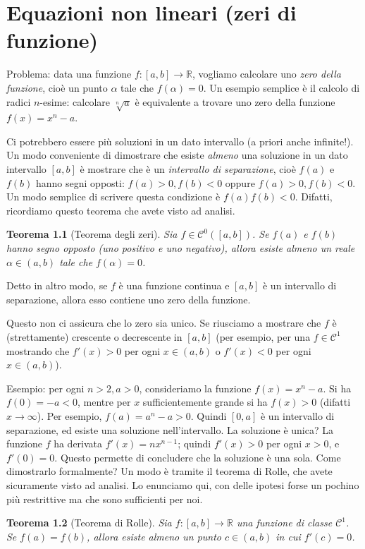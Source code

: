 \documentclass[a4paper]{report}
\newtheorem{theorem}{Teorema}[chapter]
\theoremstyle{definiton}
\theoremstyle{remark}
\begin{document}
\chapter{Equazioni non lineari (zeri di funzione)}

Problema: data una funzione $f: [a,b] \to \mathbb{R}$, vogliamo calcolare uno \emph{zero della funzione}, cioè un punto $\alpha$ tale che $f(\alpha) = 0$. Un esempio semplice è il calcolo di radici $n$-esime: calcolare $\sqrt[n]{a}$ è equivalente a trovare uno zero della funzione $f(x) = x^n - a$.

Ci potrebbero essere più soluzioni in un dato intervallo (a priori anche infinite!). Un modo conveniente di dimostrare che esiste \emph{almeno} una soluzione in un dato intervallo $[a,b]$ è mostrare che è un \emph{intervallo di separazione}, cioè $f(a)$ e $f(b)$ hanno segni opposti: $f(a)>0,f(b)<0$ oppure $f(a)>0,f(b)<0$. Un modo semplice di scrivere questa condizione è $f(a)f(b) < 0$. Difatti, ricordiamo questo teorema che avete visto ad analisi.
\begin{theorem}[Teorema degli zeri]
Sia $f \in \mathcal{C}^0([a,b])$. Se $f(a)$ e $f(b)$ hanno segno opposto (uno positivo e uno negativo), allora esiste almeno un reale $\alpha \in (a,b)$ tale che $f(\alpha) = 0$.
\end{theorem}
Detto in altro modo, se $f$ è una funzione continua e $[a,b]$ è un intervallo di separazione, allora esso contiene uno zero della funzione.

Questo non ci assicura che lo zero sia unico. Se riusciamo a mostrare che $f$ è (strettamente) crescente o decrescente in $[a,b]$ (per esempio, per una $f\in\mathcal{C}^1$ mostrando che $f'(x) > 0$ per ogni $x\in (a,b)$ o $f'(x) < 0$ per ogni $x\in (a,b)$).

Esempio: per ogni $n>2, a > 0$, consideriamo la funzione $f(x) = x^n - a$. Si ha $f(0) = -a < 0$, mentre per $x$ sufficientemente grande si ha $f(x) > 0$ (difatti $x \to \infty$). Per esempio, $f(a) = a^n - a > 0$. Quindi $[0,a]$ è un intervallo di separazione, ed esiste una soluzione nell'intervallo. La soluzione è unica? La funzione $f$ ha derivata $f'(x) = nx^{n-1}$; quindi $f'(x) > 0$ per ogni $x > 0$, e $f'(0) = 0$. Questo permette di concludere che la soluzione è una sola. Come dimostrarlo formalmente? Un modo è tramite il teorema di Rolle, che avete sicuramente visto ad analisi. Lo enunciamo qui, con delle ipotesi forse un pochino più restrittive ma che sono sufficienti per noi.

\begin{theorem}[Teorema di Rolle]
Sia $f:[a,b] \to \mathbb{R}$ una funzione di classe $\mathcal{C}^1$. Se $f(a) = f(b)$, allora esiste almeno un punto $c\in (a,b)$ in cui $f'(c) = 0$.
\end{theorem}
\end{document}
